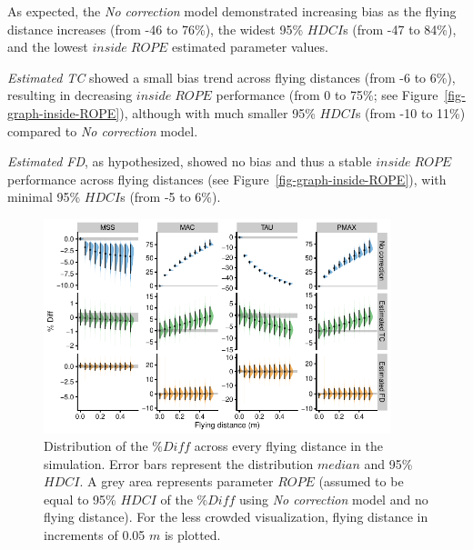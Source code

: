 \documentclass[
  letterpaper,
  DIV=11,
  numbers=noendperiod]{scrartcl}
\begin{document}
As expected, the \emph{No correction} model demonstrated increasing bias
as the flying distance increases (from -46 to 76\%), the widest 95\%
\(HDCI\)s (from -47 to 84\%), and the lowest \(inside \; ROPE\)
estimated parameter values.

\emph{Estimated TC} showed a small bias trend across flying distances
(from -6 to 6\%), resulting in decreasing \(inside \; ROPE\) performance
(from 0 to 75\%; see Figure~\ref{fig-graph-inside-ROPE}), although with
much smaller 95\% \(HDCI\)s (from -10 to 11\%) compared to \emph{No
correction} model.

\emph{Estimated FD}, as hypothesized, showed no bias and thus a stable
\(inside \; ROPE\) performance across flying distances (see
Figure~\ref{fig-graph-inside-ROPE}), with minimal 95\% \(HDCI\)s (from
-5 to 6\%).

\begin{figure}

{\centering \includegraphics[width=0.9\textwidth,height=\textheight]{shorts-simulation-paper_files/figure-pdf/fig-graph-per-FD-1.pdf}

}

\caption{\label{fig-graph-per-FD}Distribution of the \(\%Diff\) across
every flying distance in the simulation. Error bars represent the
distribution \(median\) and 95\% \(HDCI\). A grey area represents
parameter \(ROPE\) (assumed to be equal to 95\% \(HDCI\) of the
\(\%Diff\) using \emph{No correction} model and no flying distance). For
the less crowded visualization, flying distance in increments of 0.05
\(m\) is plotted.}

\end{figure}
\end{document}
